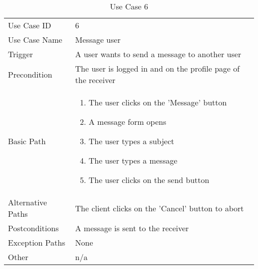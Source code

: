 \begin{table}[H]
\centering
\label{table-use-case-6}
\begin{tabular}{|p{3cm}|p{10cm}}
Use Case ID       & 6                                                           
\\
Use Case Name     & Message user                                                         
\\
Trigger           & A user wants to send a message to another user
\\
Precondition      & The user is logged in and on the profile page of the
receiver
\\
Basic Path        & \begin{enumerate}

\item The user clicks on the 'Message' button
\item A message form opens
\item The user types a subject
\item The user types a message
\item The user clicks on the send button
\end{enumerate} 
     \\
Alternative Paths & The client clicks on the 'Cancel' button to abort                        
\\
Postconditions    & A message is sent to the receiver
\\
Exception Paths   & None                          \\
Other             & n/a                                                                                                                                                                                                        
\end{tabular}
\caption{Use Case 6}
\end{table}

